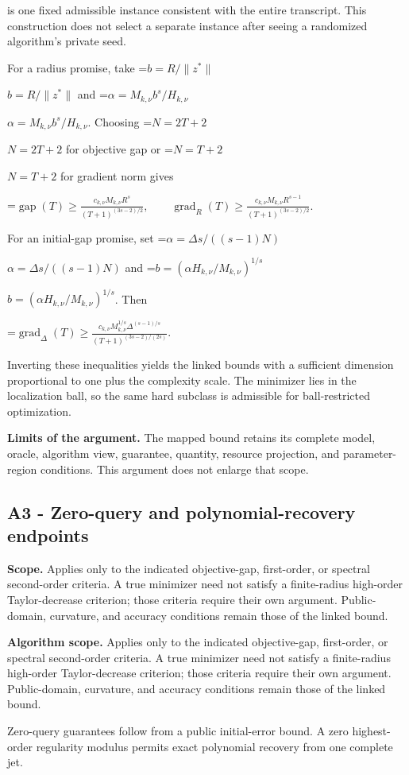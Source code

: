 \documentclass[10pt,a4paper]{article}
\newcommand{\AtlasMath}[1]{\par\begingroup\centering\setbox0=\hbox{$\displaystyle #1$}\ifdim\wd0>1.4\linewidth\typeout{ATLAS WIDE FORMULA: \the\wd0}\fi\ifdim\wd0>\linewidth\resizebox{\linewidth}{!}{\box0}\else\box0\fi\par\endgroup}
\newcommand{\AtlasInlineMath}[1]{\begingroup\setbox0=\hbox{$#1$}\ifdim\wd0>.4\linewidth\endgroup\AtlasMath{#1}\else\endgroup$#1$\fi}
\begin{document}
is one fixed admissible instance consistent with the entire transcript. This construction does not select a separate instance after seeing a randomized algorithm's private seed.

For a radius promise, take \AtlasInlineMath{b=R/\|z^*\|} and \AtlasInlineMath{\alpha=M_{k,\nu}b^s/H_{k,\nu}}. Choosing \AtlasInlineMath{N=2T+2} for objective gap or \AtlasInlineMath{N=T+2} for gradient norm gives

\AtlasMath{\operatorname{gap}(T)\ge\frac{c_{k,\nu}M_{k,\nu}R^s}{(T+1)^{(3s-2)/2}},\qquad
\operatorname{grad}_R(T)\ge\frac{c_{k,\nu}M_{k,\nu}R^{s-1}}{(T+1)^{(3s-2)/2}}.}

For an initial-gap promise, set \AtlasInlineMath{\alpha=\Delta s/((s-1)N)} and \AtlasInlineMath{b=(\alpha H_{k,\nu}/M_{k,\nu})^{1/s}}. Then

\AtlasMath{\operatorname{grad}_\Delta(T)\ge\frac{c_{k,\nu}M_{k,\nu}^{1/s}\Delta^{(s-1)/s}}{(T+1)^{(3s-2)/(2s)}}.}

Inverting these inequalities yields the linked bounds with a sufficient dimension proportional to one plus the complexity scale. The minimizer lies in the localization ball, so the same hard subclass is admissible for ball-restricted optimization.

\textbf{Limits of the argument.} The mapped bound retains its complete model, oracle, algorithm view, guarantee, quantity, resource projection, and parameter-region conditions. This argument does not enlarge that scope.

\subsection{A3 - Zero-query and polynomial-recovery endpoints}
\textbf{Scope.} Applies only to the indicated objective-gap, first-order, or spectral second-order criteria. A true minimizer need not satisfy a finite-radius high-order Taylor-decrease criterion; those criteria require their own argument. Public-domain, curvature, and accuracy conditions remain those of the linked bound.

\textbf{Algorithm scope.} Applies only to the indicated objective-gap, first-order, or spectral second-order criteria. A true minimizer need not satisfy a finite-radius high-order Taylor-decrease criterion; those criteria require their own argument. Public-domain, curvature, and accuracy conditions remain those of the linked bound.

Zero-query guarantees follow from a public initial-error bound. A zero highest-order regularity modulus permits exact polynomial recovery from one complete jet.
\end{document}
